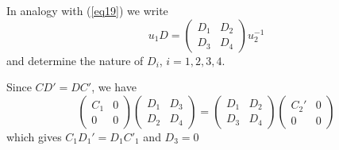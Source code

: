 In analogy with (\ref{eq19}) we write
\begin{equation*}
u_1 D = \begin{pmatrix} D_1 & D_2 \\ D_3 & D_4 \end{pmatrix}
u^{-1}_2 \tag*{$(19)'$}\label{eq19'} 
\end{equation*}
and determine the nature of $D_i$, $i = 1,2,3,4$. 

Since $CD' = DC'$, we have
$$
\begin{pmatrix}C_1 & 0 \\ 0 & 0 \end{pmatrix}   \begin{pmatrix}D_1 &
  D_3 \\ D_2 & D_4 \end{pmatrix}  = \begin{pmatrix} D_1 & D_2 \\ D_3 &
  D_4 \end{pmatrix}   \begin{pmatrix} C_2' & 0 \\ 0 & 0 \end{pmatrix} 
$$
which gives $C_1 D_1' = D_1 C'_1$ and $D_3 = 0$

